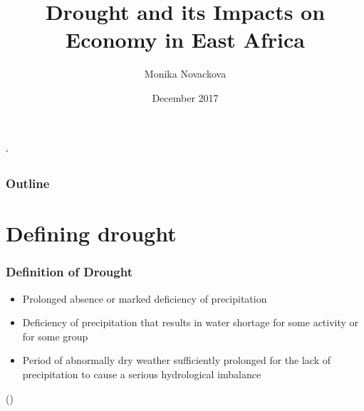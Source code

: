 \documentclass{beamer}              %
\title{Drought and its Impacts on Economy in East Africa}
\author{Monika Novackova}
\date{December 2017}
\institute{University of Sussex}
\begin{document}





\begin{frame}
\titlepage
\end{frame} `


\begin{frame}
\frametitle{Outline}
\tableofcontents
\end{frame} 



\normalsize




\section{Defining drought}



\begin{frame}\label{Definition of Drought}
\frametitle{Definition of Drought} 
 \begin{itemize}


\item Prolonged absence or marked deficiency of precipitation  
\item Deficiency of precipitation that results in water shortage for some activity
or for some group
\item Period of abnormally dry weather sufficiently prolonged for the lack of precipitation to cause a serious hydrological imbalance 
\end{itemize} 

(\citealp{heim2002,IPCCtrenberth})
\end{frame}

\end{document}
